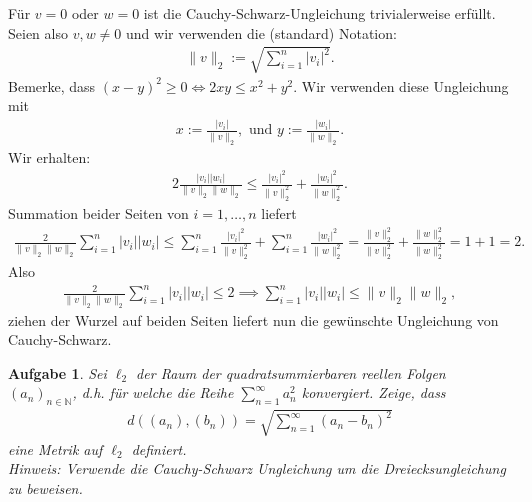 \documentclass[a4paper, 20]{exam}
\newtheorem{ex}{Aufgabe}
\begin{document}
\begin{solution} Für $v=0$ oder $w=0$ ist die Cauchy-Schwarz-Ungleichung trivialerweise erfüllt. Seien also $v,w \neq 0$ und wir verwenden die (standard) Notation:
\begin{align*}
\|v\|_2:= \sqrt{\sum_{i=1}^n |v_i|^2}.
\end{align*}
Bemerke, dass $(x-y)^2 \geq 0 \iff 2xy \leq x^2+y^2$. Wir verwenden diese Ungleichung mit 
\begin{align*}
x:= \frac{|v_i|}{\|v\|_2}, \text{ und } y:= \frac{|w_i|}{\|w\|_2}.
\end{align*}
Wir erhalten:
\begin{align*}
2 \frac{|v_i||w_i|}{\|v\|_2\|w\|_2} \leq \frac{|v_i|^2}{\|v\|_2^2}+ \frac{|w_i|^2}{\|w\|_2^2}.
\end{align*}
Summation beider Seiten von $i=1, \dots , n$ liefert
\begin{align*}
\frac{2}{\|v\|_2 \|w\|_2} \sum_{i=1}^n |v_i| |w_i| \leq \sum_{i=1}^n \frac{|v_i|^2}{\|v\|_2^2} + \sum_{i=1}^n \frac{|w_i|^2}{\|w\|_2^2} = \frac{\|v\|_2^2}{\|v\|_2^2}+ \frac{\|w\|_2^2}{\|w\|_2^2}= 1+1=2.
\end{align*}
Also
\begin{align*}
\frac{2}{\|v\|_2 \|w\|_2} \sum_{i=1}^n |v_i| |w_i| \leq 2 \implies \sum_{i=1}^n |v_i||w_i| \leq \|v\|_2 \|w\|_2,
\end{align*}
ziehen der Wurzel auf beiden Seiten liefert nun die gewünschte Ungleichung von Cauchy-Schwarz. 
\end{solution}

\begin{ex} Sei $\ell_2$ der Raum der quadratsummierbaren reellen Folgen $(a_n)_{n \in \mathbb{N}}$, d.h. für welche die Reihe $\sum_{n=1}^\infty a_n^2$ konvergiert. Zeige, dass
\begin{align*}
d((a_n), (b_n))= \sqrt{ \sum_{n=1}^\infty (a_n-b_n)^2}
\end{align*}
eine Metrik auf $\ell_2$ definiert. \\
Hinweis: Verwende die Cauchy-Schwarz Ungleichung um die Dreiecksungleichung zu beweisen.
\end{ex}
\end{document}
